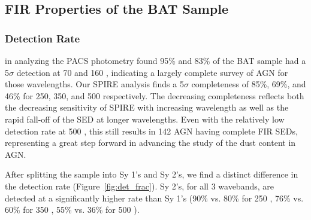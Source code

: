 \subsection{FIR Properties of the BAT Sample }
\subsubsection{Detection Rate}
\citet{Melendez:2014yu} in analyzing the PACS photometry found 95\% and 83\% of the BAT sample had a 5$\sigma$ detection at 70 and 160 \micron, indicating a largely complete survey of AGN for those wavelengths. Our SPIRE analysis finds a 5$\sigma$ completeness of 85\%, 69\%, and 46\% for 250, 350, and 500 \micron{} respectively. The decreasing completeness reflects both the decreasing sensitivity of SPIRE with increasing wavelength as well as the rapid fall-off of the SED at longer wavelengths. Even with the relatively low detection rate at 500 \micron{}, this still results in 142 AGN having complete FIR SEDs, representing a great step forward in advancing the study of the dust content in AGN. 

After splitting the sample into Sy 1's and Sy 2's, we find a distinct difference in the detection rate (Figure~\ref{fig:det_frac}). Sy 2's, for all 3 wavebands, are detected at a significantly higher rate than Sy 1's (90\% vs. 80\% for 250 \um, 76\% vs. 60\% for 350 \um, 55\% vs. 36\% for 500 \um).